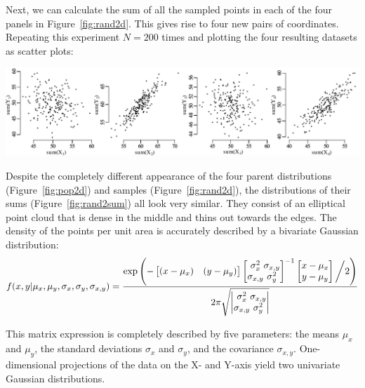 Next, we can calculate the sum of all the sampled points in each of
the four panels in Figure~\ref{fig:rand2d}. This gives rise to four
new pairs of coordinates. Repeating this experiment $N=200$ times and
plotting the four resulting datasets as scatter plots:\medskip

\noindent\includegraphics[width=\textwidth]{../figures/rand2dsum.pdf}
\begingroup {}
\label{fig:rand2sum}
\endgroup

Despite the completely different appearance of the four parent
distributions (Figure~\ref{fig:pop2d}) and samples
(Figure~\ref{fig:rand2d}), the distributions of their sums
(Figure~\ref{fig:rand2sum}) all look very similar. They consist of an
elliptical point cloud that is dense in the middle and thins out
towards the edges. The density of the points per unit area is
accurately described by a bivariate Gaussian distribution:
\begin{equation}
f(x,y|\mu_x,\mu_y,\sigma_x,\sigma_y,\sigma_{x,y}) = \frac{
\exp\left(-
\left[\begin{array}{@{}cc@{}}
(x-\mu_x) & (y-\mu_y)
\end{array}\right]
\left[\begin{array}{@{}c@{}c@{}}
\sigma^2_x & \sigma_{x,y}\\
\sigma_{x,y} & \sigma^2_y
\end{array}\right]^{-1}
\left[\begin{array}{@{}c@{}}
x-\mu_x\\
y-\mu_y
\end{array}\right] \biggl/ 2
\right)
}{2\pi\sqrt{
\left|\begin{array}{@{}c@{}c@{}}
\sigma^2_x & \sigma_{x,y}\\
\sigma_{x,y} & \sigma^2_y
\end{array}\right|
}}
\label{eq:2dgauss}
\end{equation}

This matrix expression is completely described by five parameters: the
means $\mu_x$ and $\mu_y$, the standard deviations $\sigma_x$ and
$\sigma_y$, and the covariance $\sigma_{x,y}$. One-dimensional
projections of the data on the X- and Y-axis yield two univariate
Gaussian distributions.

